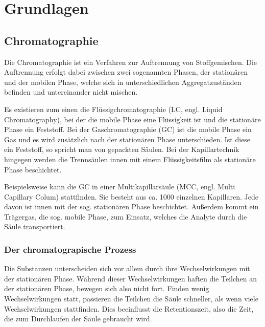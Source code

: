 
\chapter{Grundlagen}
\label{chapter:gru}

\section{Chromatographie}

Die Chromatographie ist ein Verfahren zur Auftrennung von Stoffgemischen. 
Die Auftrennung erfolgt dabei zwischen zwei sogenannten Phasen, der stationären und der mobilen Phase, welche sich in unterschiedlichen Aggregatzuständen befinden und untereinander nicht mischen. 

Es existieren zum einen die Flüssigchromatographie (LC, engl. Liquid Chromatography),
bei der die mobile Phase eine Flüssigkeit ist und die stationäre Phase ein Feststoff. Bei der Gaschromatographie (GC) ist die mobile Phase ein Gas und es wird zusätzlich nach der stationären Phase unterschieden. Ist diese ein Feststoff, so spricht man von gepackten Säulen. Bei der Kapillartechnik hingegen werden die Trennsäulen innen mit einem Flüssigkeitsfilm als stationäre Phase beschichtet.








Beispielsweise kann die GC in einer Multikapillarsäule (MCC, engl. Multi Capillary Colum) stattfinden. Sie besteht aus ca. 1000  einzelnen Kapillaren. Jede davon ist innen mit der sog. stationären Phase beschichtet. Außerdem kommt ein Trägergas, die sog. mobile Phase, zum Einsatz, welches die Analyte durch die Säule transportiert. 

\subsection{Der chromatograpische Prozess}
Die Substanzen unterscheiden sich vor allem durch ihre Wechselwirkungen mit der stationären Phase. Während dieser Wechselwirkungen haften die Teilchen an der stationären Phase, bewegen sich also nicht fort. Finden wenig Wechselwirkungen statt, passieren die Teilchen die Säule schneller, als wenn viele Wechselwirkungen stattfinden. Dies beeinflusst die Retentionszeit, also die Zeit, die zum Durchlaufen der Säule gebraucht wird.

